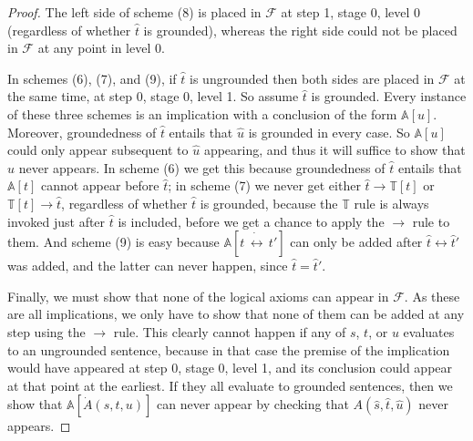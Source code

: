 \documentclass{amsart}
\theoremstyle{definition}
\begin{document}
\begin{proof}
  The left side of scheme (8) is placed in $\mathcal{F}$ at step 1, stage 0, level 0 (regardless of whether $\hat{t}$
  is grounded), whereas the right side could not be placed in $\mathcal{F}$ at any point in level 0.

  In schemes (6), (7), and (9), if $\hat{t}$ is ungrounded then both sides are placed in $\mathcal{F}$ at the same
  time, at step 0, stage 0, level 1. So assume $\hat{t}$ is grounded. Every instance of these three schemes is an
  implication with a conclusion of the form $\mathbb{A}[u]$.
  Moreover, groundedness of $\hat{t}$ entails that $\hat{u}$ is grounded in
  every case. So $\mathbb{A}[u]$ could only appear subsequent to $\hat{u}$ appearing, and thus it will suffice
  to show that $\hat{u}$ never appears. In scheme (6) we get this because groundedness of $\hat{t}$ entails that
  $\mathbb{A}[t]$ cannot appear before $\hat{t}$; in scheme (7) we never get either $\hat{t} \to \mathbb{T}[t]$
  or $\mathbb{T}[t] \to \hat{t}$, regardless of whether $\hat{t}$ is grounded, because the $\mathbb{T}$ rule is
  always invoked just after $\hat{t}$ is included, before we get a chance to apply the
  $\to$ rule to them. And scheme (9) is easy because $\mathbb{A}[t\, \dot{\leftrightarrow}\, t']$ can only be
  added after $\hat{t} \leftrightarrow \hat{t}'$ was added, and the latter can never happen, since $\hat{t} =
  \hat{t}'$.

  Finally, we must show that none of the logical axioms can appear in $\mathcal{F}$. As these are all implications,
  we only have to show that none of them can be added at any step using the $\to$ rule. This clearly cannot happen
  if any of $s$, $t$, or $u$ evaluates to an ungrounded sentence, because in that case the premise of the implication
  would have appeared at step 0, stage 0, level 1, and its conclusion could appear at that point at the earliest. If
  they all evaluate to grounded sentences, then we show that $\mathbb{A}[\dot{A}(s,t,u)]$ can never appear by checking
  that $A(\hat{s}, \hat{t}, \hat{u})$ never appears.


\end{proof}
\end{document}
